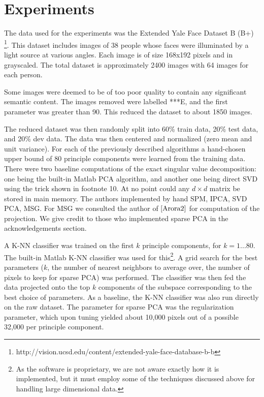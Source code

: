 \documentclass[11pt,letterpaper]{article}
\begin{document}
\section{Experiments}

The data used for the experiments was the Extended Yale Face Dataset B (B+) \footnote{{http://vision.ucsd.edu/content/extended-yale-face-database-b-b}}. This dataset includes images of 38 people whose faces were illuminated by a light source at various angles. Each image is of size 168x192 pixels and in grayscaled. The total dataset is approximately 2400 images with 64 images for each person. 

Some images were deemed to be of too poor quality to contain any significant semantic content. The images removed were labelled  ***E, and the first parameter was greater than 90. This reduced the dataset to about 1850 images. 

The reduced dataset was then randomly split into 60\% train data, 20\% test data, and 20\% dev data. The data was then centered and normalized (zero mean and unit variance). For each of the previously described algorithms a hand-chosen upper bound of 80 principle components were learned from the training data. There were two baseline computations of the exact singular value decomposition: one being the built-in Matlab PCA algorithm, and another one being direct SVD using the trick shown in footnote 10. At no point could any $d \times d$ matrix be stored in main memory. The authors implemented by hand SPM, IPCA, SVD PCA, MSG. For MSG we consulted the author of $\cite{Arora2}$ for computation of the projection. We give credit to those who implemented sparse PCA in the acknowledgements section.

A K-NN classifier was trained on the first $k$ principle components, for $k = 1 ... 80$. The built-in Matlab K-NN classifier was used for this\footnote{As the software is proprietary, we are not aware exactly how it is implemented, but it must employ some of the techniques discussed above for handling large dimensional data.}. A grid search for the best parameters ($k$, the number of nearest neighbors to average over, the number of pixels to keep for sparse PCA) was performed. The classifier was then fed the data projected onto the top $k$ components of the subspace corresponding to the best choice of parameters. As a baseline, the K-NN classifier was also run directly on the raw dataset. The parameter for sparse PCA was the regularization parameter, which upon tuning yielded about 10,000 pixels out of a possible 32,000 per principle component. 
\end{document}
